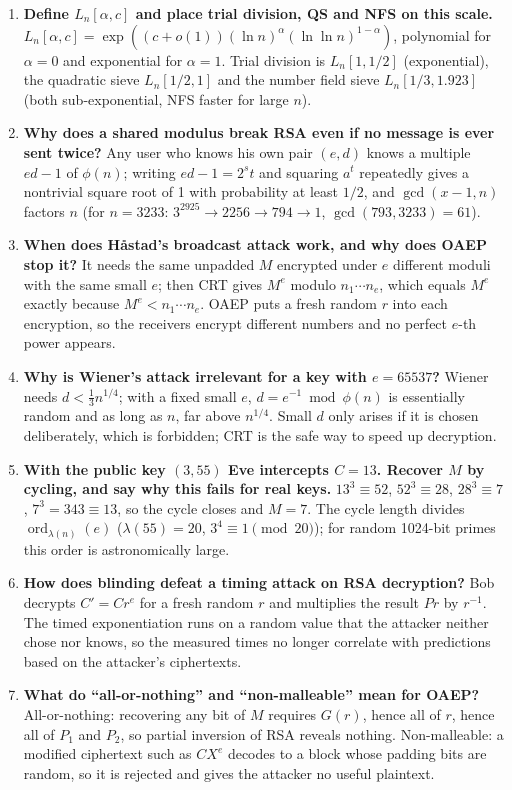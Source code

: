 \begin{enumerate}[leftmargin=1.6em,itemsep=3pt]
  \item \textbf{Define $L_n[\alpha, c]$ and place trial division, QS and NFS on this scale.} $L_n[\alpha, c] = \exp((c + o(1))(\ln n)^\alpha(\ln\ln n)^{1-\alpha})$, polynomial for $\alpha = 0$ and exponential for $\alpha = 1$. Trial division is $L_n[1, 1/2]$ (exponential), the quadratic sieve $L_n[1/2, 1]$ and the number field sieve $L_n[1/3, 1.923]$ (both sub-exponential, NFS faster for large $n$).
  \item \textbf{Why does a shared modulus break RSA even if no message is ever sent twice?} Any user who knows his own pair $(e, d)$ knows a multiple $ed - 1$ of $\phi(n)$; writing $ed - 1 = 2^s t$ and squaring $a^t$ repeatedly gives a nontrivial square root of 1 with probability at least $1/2$, and $\gcd(x - 1, n)$ factors $n$ (for $n = 3233$: $3^{2925} \to 2256 \to 794 \to 1$, $\gcd(793, 3233) = 61$).
  \item \textbf{When does H\aa stad's broadcast attack work, and why does OAEP stop it?} It needs the same unpadded $M$ encrypted under $e$ different moduli with the same small $e$; then CRT gives $M^e$ modulo $n_1 \cdots n_e$, which equals $M^e$ exactly because $M^e < n_1 \cdots n_e$. OAEP puts a fresh random $r$ into each encryption, so the receivers encrypt different numbers and no perfect $e$-th power appears.
  \item \textbf{Why is Wiener's attack irrelevant for a key with $e = 65537$?} Wiener needs $d < \frac13 n^{1/4}$; with a fixed small $e$, $d = e^{-1} \bmod \phi(n)$ is essentially random and as long as $n$, far above $n^{1/4}$. Small $d$ only arises if it is chosen deliberately, which is forbidden; CRT is the safe way to speed up decryption.
  \item \textbf{With the public key $(3, 55)$ Eve intercepts $C = 13$. Recover $M$ by cycling, and say why this fails for real keys.} $13^3 \equiv 52$, $52^3 \equiv 28$, $28^3 \equiv 7$, $7^3 = 343 \equiv 13$, so the cycle closes and $M = 7$. The cycle length divides $\operatorname{ord}_{\lambda(n)}(e)$ ($\lambda(55) = 20$, $3^4 \equiv 1 \pmod{20}$); for random 1024-bit primes this order is astronomically large.
  \item \textbf{How does blinding defeat a timing attack on RSA decryption?} Bob decrypts $C' = C r^e$ for a fresh random $r$ and multiplies the result $P r$ by $r^{-1}$. The timed exponentiation runs on a random value that the attacker neither chose nor knows, so the measured times no longer correlate with predictions based on the attacker's ciphertexts.
  \item \textbf{What do ``all-or-nothing'' and ``non-malleable'' mean for OAEP?} All-or-nothing: recovering any bit of $M$ requires $G(r)$, hence all of $r$, hence all of $P_1$ and $P_2$, so partial inversion of RSA reveals nothing. Non-malleable: a modified ciphertext such as $C X^e$ decodes to a block whose padding bits are random, so it is rejected and gives the attacker no useful plaintext.

\end{enumerate}
